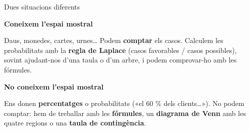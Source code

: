 \documentclass[11pt,a4paper]{article}
\begin{document}
  
\begin{fmdef}{Dues situacions diferents}
\par\noindent \begin{minipage}[t]{0.488\linewidth}\vspace{0pt}\begin{tcolorbox}[enhanced,colback=fmsurface,colframe=fmmuted!35,arc=2.5mm,boxrule=0.6pt,left=2.5mm,right=2.5mm,top=1.5mm,bottom=1.5mm,before upper=\raggedright,equal height group=cmp1]{\color{fmnavy}\bfseries Coneixem l'espai mostral}\par

          

Daus, monedes, cartes, urnes\dots{} Podem \textbf{comptar} els casos. Calculem les probabilitats amb la \textbf{regla de Laplace} (casos favorables / casos possibles), sovint ajudant-nos d'una taula o d'un arbre, i podem comprovar-ho amb les fórmules.\end{tcolorbox}\end{minipage}\hfill\begin{minipage}[t]{0.488\linewidth}\vspace{0pt}\begin{tcolorbox}[enhanced,colback=fmsurface,colframe=fmmuted!35,arc=2.5mm,boxrule=0.6pt,left=2.5mm,right=2.5mm,top=1.5mm,bottom=1.5mm,before upper=\raggedright,equal height group=cmp1]{\color{fmnavy}\bfseries No coneixem l'espai mostral}\par

          

Ens donen \textbf{percentatges} o probabilitats («el 60 \% dels clients\dots{}»). No podem comptar: hem de treballar amb les \textbf{fórmules}, un \textbf{diagrama de Venn} amb les quatre regions o una \textbf{taula de contingència}.\end{tcolorbox}\end{minipage}\par\medskip
\end{fmdef}
\end{document}
